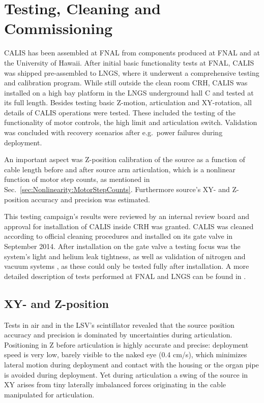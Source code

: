 \section{Testing, Cleaning and Commissioning} \label{sec:Testing}\label{sec:Commissioning}
CALIS has been assembled at FNAL from components produced at FNAL and at the University of Hawaii. After initial basic functionality tests at FNAL, CALIS was shipped pre-assembled to LNGS, where it underwent a comprehensive testing and calibration program. While still outside the clean room CRH, CALIS was installed on a high bay platform in the LNGS underground hall C and tested at its full length. Besides testing basic Z-motion, articulation and XY-rotation, all details of CALIS operations were tested. These included the testing of the functionality of motor controls, the high limit and articulation switch. Validation was concluded with recovery scenarios after e.g.~power failures during deployment.

An important aspect was Z-position calibration of the source as a function of cable length before and after source arm articulation, which is a nonlinear function of motor step counts, as mentioned in Sec.~\ref{sec:Nonlinearity:MotorStepCounts}. Furthermore source's XY- and Z-position accuracy and precision was estimated.

This testing campaign's results were reviewed by an internal review board and approval for installation of CALIS inside CRH was granted. CALIS was cleaned according to official cleaning procedures and installed on its gate valve in September 2014.
After installation on the gate valve a testing focus was the system's light and helium leak tightness, as well as validation of nitrogen and vacuum systems , as these could only be tested fully after installation. A more detailed description of tests performed at FNAL and LNGS can be found in \cite{thesis:Hackett, thesis:Edkins}.

\subsection*{XY- and Z-position}
Tests in air and in the LSV's scintillator revealed that the source position accuracy and precision is dominated by uncertainties during articulation. Positioning in Z before articulation is highly accurate and precise: deployment speed is very low, barely visible to the naked eye (0.4 cm/s), which minimizes lateral motion during deployment and contact with the housing or the organ pipe is avoided during deployment. Yet during articulation a swing of the source in XY arises from tiny laterally imbalanced forces originating in the cable manipulated for articulation. 

